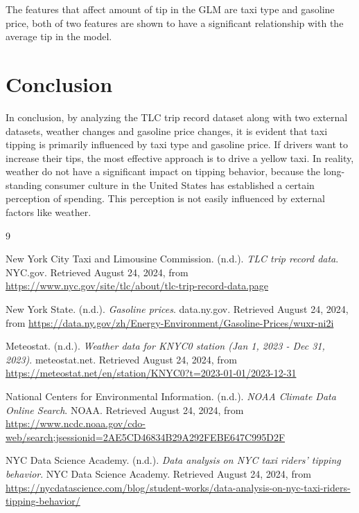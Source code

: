 \documentclass[11pt]{article}
\begin{document}
The features that affect amount of tip in the GLM are taxi type and gasoline price, both of two features are shown to have a significant relationship with the average tip in the model.


\section{Conclusion}
In conclusion, by analyzing the TLC trip record dataset along with two external datasets, weather changes and gasoline price changes, it is evident that taxi tipping is primarily influenced 
by taxi type and gasoline price. If drivers want to increase their tips, the most effective approach is to drive a yellow taxi. In reality, weather do not have a significant impact on 
tipping behavior, because the long-standing consumer culture in the United States has established a certain perception of spending. This perception is not easily influenced by external 
factors like weather.


\clearpage
\begin{thebibliography}{9}

    New York City Taxi and Limousine Commission. (n.d.). 
    \textit{TLC trip record data}. NYC.gov. Retrieved August 24, 2024, 
    from \url{https://www.nyc.gov/site/tlc/about/tlc-trip-record-data.page}
    
    New York State. (n.d.). 
    \textit{Gasoline prices}. data.ny.gov. Retrieved August 24, 2024, 
    from \url{https://data.ny.gov/zh/Energy-Environment/Gasoline-Prices/wuxr-ni2i}
    
    Meteostat. (n.d.). 
    \textit{Weather data for KNYC0 station (Jan 1, 2023 - Dec 31, 2023)}. meteostat.net. 
    Retrieved August 24, 2024, from \url{https://meteostat.net/en/station/KNYC0?t=2023-01-01/2023-12-31}
    
    National Centers for Environmental Information. (n.d.). 
    \textit{NOAA Climate Data Online Search}. NOAA. Retrieved August 24, 2024, 
    from \url{https://www.ncdc.noaa.gov/cdo-web/search;jsessionid=2AE5CD46834B29A292FEBE647C995D2F}

    NYC Data Science Academy. (n.d.). 
    \textit{Data analysis on NYC taxi riders' tipping behavior}. 
    NYC Data Science Academy. Retrieved August 24, 2024, from \url{https://nycdatascience.com/blog/student-works/data-analysis-on-nyc-taxi-riders-tipping-behavior/}



\end{thebibliography}
    
\end{document}
